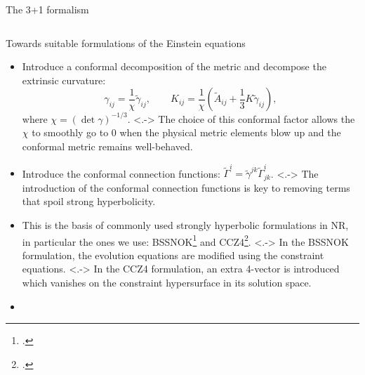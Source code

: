 \documentclass[smaller,aspectratio=169]{beamer}
\begin{document}
\begin{frame}{The 3+1 formalism}
\begin{columns}
\begin{column}{0.4\columnwidth}
{
            }
        \end{column}
    \end{columns}
\end{frame}

\begin{frame}{Towards suitable formulations of the Einstein equations}
    \begin{itemize}
    \small
    \item<+->
        Introduce a \alert{conformal} decomposition of the metric and decompose 
        the extrinsic curvature:
        \begin{equation*}
            \gamma_{ij} = \frac{1}{\chi}\tilde{\gamma}_{ij},\qquad K_{ij} =
            \frac{1}{\chi}\left(\tilde{A}_{ij} + 
            \frac{1}{3}K\tilde{\gamma}_{ij}\right),
        \end{equation*}
        where $\chi = (\det \gamma)^{-1/3}$.
    \note[item]<.->{ 
        The choice of this conformal factor allows the $\chi$ to smoothly go to 
        0 when the physical metric elements blow up and the conformal metric
        remains well-behaved.}
    \item<+->
        Introduce the \alert{conformal connection functions}: 
        $\tilde{\Gamma}^i=\tilde{\gamma}^{jk}\tilde{\Gamma}^i_{jk}$.
    \note[item]<.->{
        The introduction of the conformal connection functions is key to 
        removing terms that spoil strong hyperbolicity.}
    \item<+->
        This is the basis of commonly used strongly hyperbolic formulations in 
        NR, in particular the ones we use: BSSNOK\footcite{Nakamura:1987zz,
        Shibata:1995we,Baumgarte:1998te} and CCZ4\footcite{Alic:2011gg}.
    \note[item]<.->{
        In the BSSNOK formulation, the evolution equations are modified using 
        the constraint equations.}
    \note[item]<.->{
        In the CCZ4 formulation, an extra 4-vector is introduced which vanishes
        on the constraint hypersurface in its solution space.}
    \item<+->

\end{itemize}
\end{frame}
\end{document}
